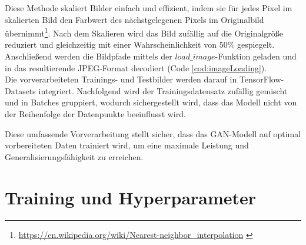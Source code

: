 Diese Methode skaliert Bilder einfach und effizient, indem sie für jedes Pixel im skalierten Bild den Farbwert des nächstgelegenen Pixels im Originalbild übernimmt\footnote{\url{https://en.wikipedia.org/wiki/Nearest-neighbor_interpolation} \label{note:nearestNeighbor}}.
Nach dem Skalieren wird das Bild zufällig auf die Originalgröße reduziert und gleichzeitig mit einer Wahrscheinlichkeit von 50\% gespiegelt.
Anschließend werden die Bildpfade mittels der $load\_image$-Funktion geladen und in das resultierende JPEG-Format decodiert (Code \ref{cod:imageLoading}).
\\\newline
Die vorverarbeiteten Trainings- und Testbilder werden darauf in TensorFlow-Datasets integriert. Nachfolgend wird der Trainingsdatensatz zufällig gemischt und in Batches gruppiert, wodurch sichergestellt wird, dass das Modell nicht von der Reihenfolge der Datenpunkte beeinflusst wird.


Diese umfassende Vorverarbeitung stellt sicher, dass das GAN-Modell auf optimal vorbereiteten Daten trainiert wird, um eine maximale Leistung und Generalisierungsfähigkeit zu erreichen.
 \newpage



\newpage
\section{Training und Hyperparameter}

